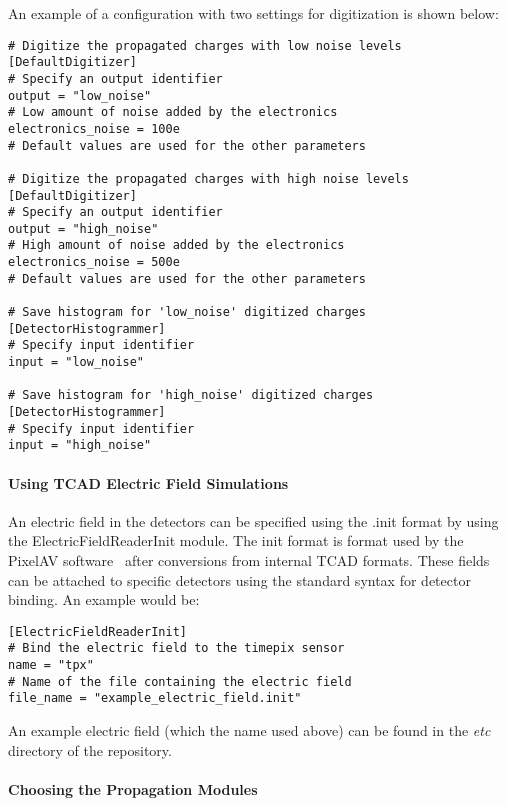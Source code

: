 An example of a configuration with two settings for digitization is shown below:
\begin{verbatim}
# Digitize the propagated charges with low noise levels
[DefaultDigitizer]
# Specify an output identifier 
output = "low_noise"
# Low amount of noise added by the electronics
electronics_noise = 100e
# Default values are used for the other parameters

# Digitize the propagated charges with high noise levels
[DefaultDigitizer]
# Specify an output identifier
output = "high_noise"
# High amount of noise added by the electronics
electronics_noise = 500e
# Default values are used for the other parameters

# Save histogram for 'low_noise' digitized charges
[DetectorHistogrammer]
# Specify input identifier 
input = "low_noise"

# Save histogram for 'high_noise' digitized charges
[DetectorHistogrammer]
# Specify input identifier 
input = "high_noise"
\end{verbatim}


\paragraph{Using TCAD Electric Field Simulations}
\label{sec:tcad_electric_field_simulations}
An electric field in the detectors can be specified using the .init format by using the ElectricFieldReaderInit module. The init format is format used by the PixelAV software~\cite{swartz2002detailed,swartz2003cms} after conversions from internal TCAD formats. These fields can be attached to specific detectors using the standard syntax for detector binding. An example would be:
\begin{verbatim}
[ElectricFieldReaderInit]
# Bind the electric field to the timepix sensor
name = "tpx"
# Name of the file containing the electric field
file_name = "example_electric_field.init"
\end{verbatim}
An example electric field (which the name used above) can be found in the \textit{etc} directory of the \apsq repository.


\paragraph{Choosing the Propagation Modules}
\wip

